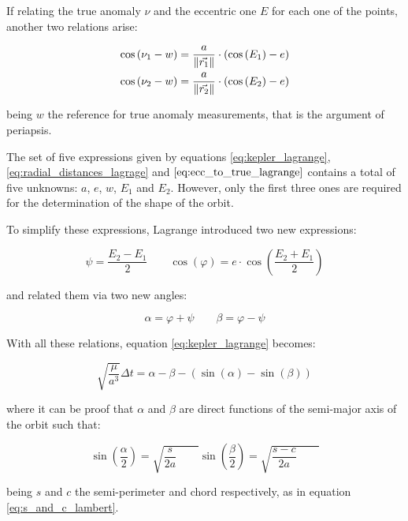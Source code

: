 If relating the true anomaly $\nu$ and the eccentric one $E$ for each one of the
points, another two relations arise:

\begin{align}
  \cos{(\nu_{1} - w)} & = \frac{a}{\lVert\vec{r_{1}}\rVert} \cdot \left(\cos{(E_1) - e} \right) \\
  \cos{(\nu_{2} - w)} & = \frac{a}{\lVert\vec{r_{2}}\rVert} \cdot \left(\cos{(E_2) - e} \right)
  \label{eq:ecc_to_true_lagrange}
\end{align}

being $w$ the reference for true anomaly measurements, that is the argument of
periapsis.

The set of five expressions given by equations \ref{eq:kepler_lagrange},
\ref{eq:radial_distances_lagrage} and $\ref{eq:ecc_to_true_lagrange}$ contains a
total of five unknowns: $a$, $e$, $w$, $E_{1}$ and $E_{2}$. However, only
the first three ones are required for the determination of the shape of the
orbit.

To simplify these expressions, Lagrange introduced two new expressions:

\begin{equation}
  \psi = \frac{E_2 - E_1}{2}\quad\quad
  \cos{(\varphi)} = e \cdot \cos{\left(\frac{E_2 + E_1}{2} \right)}
\end{equation}

and related them via two new angles:

\begin{equation}
  \alpha = \varphi + \psi\quad\quad
  \beta = \varphi - \psi
\end{equation}

With all these relations, equation \ref{eq:kepler_lagrange} becomes:

\begin{equation}
  \sqrt{\frac{\mu}{a^3}} \Delta t = \alpha - \beta - \left(\sin{(\alpha)} - \sin{(\beta)}\right)
  \label{eq:kepler_lagrange_simple}
\end{equation}

where it can be proof that $\alpha$ and $\beta$ are direct functions of the
semi-major axis of the orbit such that:

\begin{equation}
  \sin{\left(\frac{\alpha}{2} \right)} = \sqrt{\frac{s}{2a}\quad\quad}
  \sin{\left(\frac{\beta}{2} \right)} = \sqrt{\frac{s - c}{2a}\quad\quad}
  \label{eq:alpha_beta}
\end{equation}

being $s$ and $c$ the semi-perimeter and chord respectively, as in equation
\ref{eq:s_and_c_lambert}.

